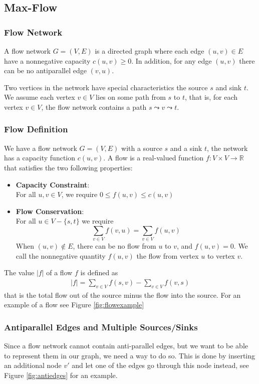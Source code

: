 \subsection{Max-Flow}
\subsubsection{Flow Network}
A flow network $G=(V,E)$ is a directed graph where each edge $(u,v) \in E$ have
a nonnegative capacity $c(u,v) \geq 0$. In addition, for any edge $(u,v)$ there
can be no antiparallel edge $(v,u)$.

Two vertices in the network have special characteristics the source $s$ and sink
$t$. We assume each vertex $v \in V$ lies on some path from $s$ to $t$, that is,
for each vertex $v \in V$, the flow network contains a path $s \leadsto v
\leadsto t$.

\subsubsection{Flow Definition}
We have a flow network $G = (V,E)$ with a source $s$ and a sink $t$, the network
has a capacity function $c(u,v)$. A flow is a real-valued function $f : V \times
V \rightarrow \mathbb{R}$ that satisfies the two following properties:
\begin{itemize}
  \item \textbf{Capacity Constraint}:\\
    For all $u,v \in V$, we require $0 \leq f(u,v) \leq c(u,v)$
  \item \textbf{Flow Conservation}:\\
    For all $u \in V - \{s,t\}$ we require
    \[
      \sum_{v\in V}f(v,u) = \sum_{v\in V}f(u,v)
    \]
    When $(u,v) \notin E$, there can be no flow from $u$ to $v$, and $f(u,v) =
    0$. We call the nonnegative quantity $f(u,v)$ the flow from vertex $u$ to
    vertex $v$.
\end{itemize}

\noindent The value $|f|$ of a flow $f$ is defined as
\begin{align*}
  |f| = \sum_{v \in V} f(s,v) - \sum_{v \in V} f(v,s)
\end{align*}
that is the total flow out of the source minus the flow into the source.  For an
example of a flow see Figure \ref{fig:flowexample}

\subsubsection{Antiparallel Edges and Multiple Sources/Sinks}
Since a flow network cannot contain anti-parallel edges, but we want to be able
to represent them in our graph, we need a way to do so. This is done by
inserting an additional node $v'$ and let one of the edges go through this node
instead, see Figure \ref{fig:antiedges} for an example.


